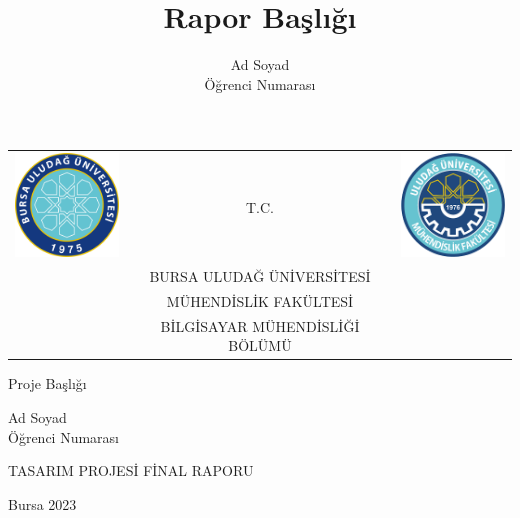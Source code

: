 \documentclass[hidelinks,12pt]{article}
\author{Ad Soyad\\Öğrenci Numarası}
\title{Rapor Başlığı}
\date{}
\begin{document}
\begin{titlepage}
    \begin{tabular}{c c c}
        \includegraphics[width=3cm]{./bursa_uludag_logo.png} &
        T.C. &
        \includegraphics[width=3cm]{./bursa_uludag_muh_logo.png} \\
        & BURSA ULUDAĞ ÜNİVERSİTESİ & \\
        & MÜHENDİSLİK FAKÜLTESİ & \\
        & BİLGİSAYAR MÜHENDİSLİĞİ BÖLÜMÜ & \\
    \end{tabular}
    \newline
    \newline
    \newline
    \newline
    \newline
    \newline
    \begin{center}
        \large{Proje Başlığı}
    \end{center}
    \hfill \break
    \newline
    \begin{center}
        Ad Soyad\\Öğrenci Numarası\\
    \end{center}
    \hfill \break
    \newline
    \begin{center}
        TASARIM PROJESİ FİNAL RAPORU\\
    \end{center}
    \hfill \break
    \newline
    \newline
    \newline
    \newline
    \newline
    \newline
    \hfill \break
    \begin{center}
        Bursa 2023
    \end{center}
\end{titlepage}
\end{document}
